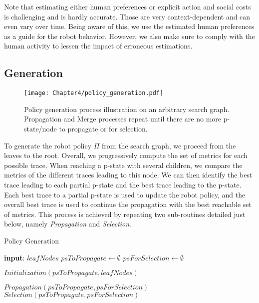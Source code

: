 Note that estimating either human preferences or explicit action and social costs is challenging and is hardly accurate. Those are very context-dependent and can even vary over time.
Being aware of this, we use the estimated human preferences as a guide for the robot behavior. However, we also make sure to comply with the human activity to lessen the impact of erroneous estimations. 

    \subsection{Generation}

\begin{figure}
    \texttt{[image: Chapter4/policy\_generation.pdf]}
    \caption{Policy generation process illustration on an arbitrary search graph. Propagation and Merge processes repeat until there are no more p-state/node to propagate or for selection.}
    \label{fig:policy_generation}
\end{figure}

To generate the robot policy $\Pi$ from the search graph, we proceed from the leaves to the root. 
Overall, we progressively compute the set of metrics for each possible trace. When reaching a p-state with several children, we compare the metrics of the different traces leading to this node. We can then identify the best trace leading to each partial p-state and the best trace leading to the p-state. Each best trace to a partial p-state is used to update the robot policy, and the overall best trace is used to continue the propagation with the best reachable set of metrics.
This process is achieved by repeating two sub-routines detailed just below, namely \textit{Propagation} and \textit{Selection}. 

\begin{algorithm}
\caption{Policy Generation}\label{alg:policy_generation}
\begin{algorithmic}[1]

\State \textbf{input}: $leafNodes$ 
\State $psToPropagate \gets \emptyset$
\State $psForSelection \gets \emptyset$

\State $Initialization(psToPropagate, leafNodes)$

    \State $Propagation(psToPropagate, psForSelection)$
    \State $Selection(psToPropagate, psForSelection)$
\EndWhile

\end{algorithmic}
\end{algorithm}

